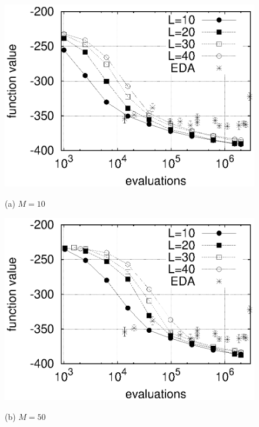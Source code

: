 \begin{figure}[tbp]
\centering
\centerline{\includegraphics[width=\figlength\linewidth]{./data_his/his_1dising_s10.eps}}
(a) $M=10$\\
\vspace{0.1in}
\centerline{\includegraphics[width=\figlength\linewidth]{./data_his/his_1dising_s50.eps}}
(b) $M=50$
\caption{}
\label{his-1d-ising}
\end{figure}

